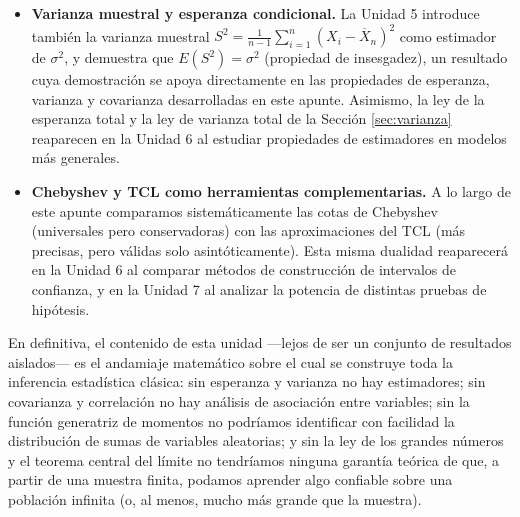 \documentclass[11pt,a4paper]{article}
\theoremstyle{plain}
\theoremstyle{definition}
\theoremstyle{remark}
\begin{document}
\begin{itemize}
\item \textbf{Varianza muestral y esperanza condicional.} La Unidad 5 introduce también la varianza muestral $S^2=\frac{1}{n-1}\sum_{i=1}^n (X_i-\overline{X}_n)^2$ como estimador de $\sigma^2$, y demuestra que $E(S^2)=\sigma^2$ (propiedad de insesgadez), un resultado cuya demostración se apoya directamente en las propiedades de esperanza, varianza y covarianza desarrolladas en este apunte. Asimismo, la ley de la esperanza total y la ley de varianza total de la Sección \ref{sec:varianza} reaparecen en la Unidad 6 al estudiar propiedades de estimadores en modelos más generales.

\item \textbf{Chebyshev y TCL como herramientas complementarias.} A lo largo de este apunte comparamos sistemáticamente las cotas de Chebyshev (universales pero conservadoras) con las aproximaciones del TCL (más precisas, pero válidas solo asintóticamente). Esta misma dualidad reaparecerá en la Unidad 6 al comparar métodos de construcción de intervalos de confianza, y en la Unidad 7 al analizar la potencia de distintas pruebas de hipótesis.
\end{itemize}

En definitiva, el contenido de esta unidad —lejos de ser un conjunto de resultados aislados— es el andamiaje matemático sobre el cual se construye toda la inferencia estadística clásica: sin esperanza y varianza no hay estimadores; sin covarianza y correlación no hay análisis de asociación entre variables; sin la función generatriz de momentos no podríamos identificar con facilidad la distribución de sumas de variables aleatorias; y sin la ley de los grandes números y el teorema central del límite no tendríamos ninguna garantía teórica de que, a partir de una muestra finita, podamos aprender algo confiable sobre una población infinita (o, al menos, mucho más grande que la muestra).
\end{document}
